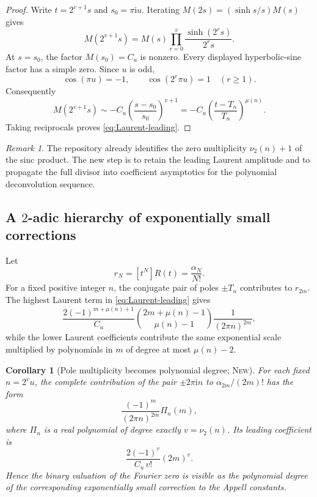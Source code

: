 \documentclass[11pt,oneside]{article}
\theoremstyle{frontier}
\newtheorem{corollary}[theorem]{Corollary}
\theoremstyle{definition}
\theoremstyle{remark}
\newtheorem{remark}[theorem]{Remark}
\newcommand{\ii}{\mathrm i}
\newcommand{\vtwo}{\nu_2}
\newcommand{\statusnew}{\textsc{New}}
\begin{document}
\begin{proof}
Write $t=2^{v+1}s$ and $s_0=\pi\ii u$.  Iterating
$M(2s)=(\sinh s/s)M(s)$ gives
\begin{equation}
 M(2^{v+1}s)=M(s)\prod_{r=0}^{v}\frac{\sinh(2^rs)}{2^rs}.
 \label{eq:M-iterate-pole}
\end{equation}
At $s=s_0$, the factor $M(s_0)=C_u$ is nonzero.  Every displayed hyperbolic-sine factor has a
simple zero.  Since $u$ is odd,
\begin{equation*}
 \cos(\pi u)=-1,
 \qquad
 \cos(2^r\pi u)=1\quad(r\ge1).
\end{equation*}
Consequently
\[
 M(2^{v+1}s)
 \sim -C_u\left(\frac{s-s_0}{s_0}\right)^{v+1}
 =-C_u\left(\frac{t-T_n}{T_n}\right)^{\mu(n)}.
\]
Taking reciprocals proves \eqref{eq:Laurent-leading}.
\end{proof}

\begin{remark}
The repository already identifies the zero multiplicity $\vtwo(n)+1$ of the sinc product.  The new
step is to retain the leading Laurent amplitude and to propagate the full divisor into coefficient
asymptotics for the polynomial deconvolution sequence.
\end{remark}

\subsection{A \texorpdfstring{$2$}{2}-adic hierarchy of exponentially small corrections}

Let
\begin{equation}
 r_N=[t^N]R(t)=\frac{\alpha_N}{N!}.
 \label{eq:rN}
\end{equation}
For a fixed positive integer $n$, the conjugate pair of poles $\pm T_n$ contributes to $r_{2m}$.
The highest Laurent term in \eqref{eq:Laurent-leading} gives
\begin{equation}
 \frac{2(-1)^{m+\mu(n)+1}}{C_u}
 \binom{2m+\mu(n)-1}{\mu(n)-1}
 \frac1{(2\pi n)^{2m}},
 \label{eq:general-shell-leading}
\end{equation}
while the lower Laurent coefficients contribute the same exponential scale multiplied by
polynomials in $m$ of degree at most $\mu(n)-2$.

\begin{corollary}[Pole multiplicity becomes polynomial degree; \statusnew]
\label{cor:pole-degree}
For each fixed $n=2^vu$, the complete contribution of the pair $\pm2\pi\ii n$ to
$\alpha_{2m}/(2m)!$ has the form
\begin{equation}
 \frac{(-1)^m}{(2\pi n)^{2m}}\Pi_n(m),
 \label{eq:Pi-shell}
\end{equation}
where $\Pi_n$ is a real polynomial of degree exactly $v=\vtwo(n)$.  Its leading coefficient is
\begin{equation}
 \frac{2(-1)^{v}}{C_u\,v!}(2m)^v.
 \label{eq:Pi-leading}
\end{equation}
Hence the binary valuation of the Fourier zero is visible as the polynomial degree of the
corresponding exponentially small correction to the Appell constants.
\end{corollary}
\end{document}

